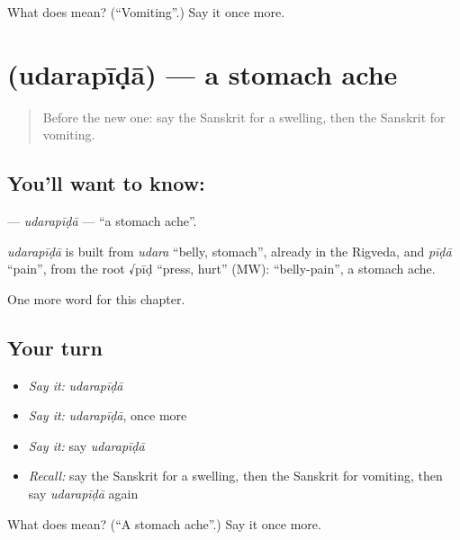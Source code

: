 \begin{tcolorbox}[breakable,colback=teal!4,colframe=teal!35!black,title={Before you move on}]
What does  mean? (\textquotedblleft{}Vomiting\textquotedblright{}.) Say it once more.
\end{tcolorbox}
\section[\texorpdfstring{\sk{उदरपीडा} (udarapīḍā)}{उदरपीडा (udarapīḍā)}]{ (udarapīḍā) — a stomach ache}

\label{lesson:SA-C150-udarapida}



\begin{quote}
Before the new one: say the Sanskrit for a swelling, then the Sanskrit for vomiting.
\end{quote}

\subsection*{You'll want to know: }
\textbf{} — \emph{udarapīḍā} — \textquotedblleft{}a stomach ache\textquotedblright{}.

\begin{cousinweb}
\emph{udarapīḍā} is built from \emph{udara} \textquotedblleft{}belly, stomach\textquotedblright{}, already in the Rigveda, and \emph{pīḍā} \textquotedblleft{}pain\textquotedblright{}, from the root √pīḍ \textquotedblleft{}press, hurt\textquotedblright{} (MW): \textquotedblleft{}belly-pain\textquotedblright{}, a stomach ache.
\end{cousinweb}

\begin{grammarlens}[title={What you've built}]
One more word for this chapter.
\end{grammarlens}

\subsection*{Your turn}
\begin{itemize}
\raggedright
  \item \emph{Say it:} \emph{udarapīḍā}
  \item \emph{Say it:} \emph{udarapīḍā}, once more
  \item \emph{Say it:} say \emph{udarapīḍā}
  \item \emph{Recall:} say the Sanskrit for a swelling, then the Sanskrit for vomiting, then say \emph{udarapīḍā} again
\end{itemize}

\begin{tcolorbox}[breakable,colback=teal!4,colframe=teal!35!black,title={Before you move on}]
What does  mean? (\textquotedblleft{}A stomach ache\textquotedblright{}.) Say it once more.
\end{tcolorbox}
